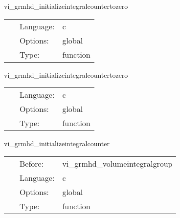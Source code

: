 \vspace{5mm}


\hspace{5mm} vi\_grmhd\_initializeintegralcountertozero 

\hspace{5mm}{\it initialize integralcounter variable to zero } 


\hspace{5mm}

 \begin{tabular*}{160mm}{cll} 
~ & Language:  & c \\ 
~ & Options:  & global \\ 
~ & Type:  & function \\ 
\end{tabular*} 


\vspace{5mm}


\hspace{5mm} vi\_grmhd\_initializeintegralcountertozero 

\hspace{5mm}{\it initialize integralcounter variable to zero } 


\hspace{5mm}

 \begin{tabular*}{160mm}{cll} 
~ & Language:  & c \\ 
~ & Options:  & global \\ 
~ & Type:  & function \\ 
\end{tabular*} 


\vspace{5mm}


\hspace{5mm} vi\_grmhd\_initializeintegralcounter 

\hspace{5mm}{\it initialize integralcounter variable } 


\hspace{5mm}

 \begin{tabular*}{160mm}{cll} 
~ & Before:  & vi\_grmhd\_volumeintegralgroup \\ 
~ & Language:  & c \\ 
~ & Options:  & global \\ 
~ & Type:  & function \\ 
\end{tabular*} 


